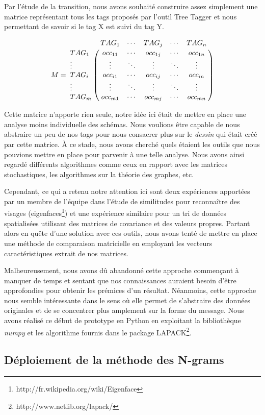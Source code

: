 \documentclass[a4paper,12pt]{report}
\begin{document}
Par l'étude de la transition, nous avons souhaité construire assez simplement une matrice représentant tous les tags proposés par l'outil Tree Tagger et nous permettant de savoir si le tag X est suivi du tag Y.

\[M=\bordermatrix{
&TAG_{1}&\cdots&TAG_{j}&\cdots&TAG_{n}\cr
TAG_{1}& occ_{11} & \cdots & occ_{1j} & \cdots & occ_{1n} \cr
\vdots&\vdots&\ddots&\vdots&\ddots&\vdots\cr
TAG_{i}& occ_{i1} & \cdots & occ_{ij} & \cdots & occ_{in} \cr
\vdots&\vdots&\ddots&\vdots&\ddots&\vdots\cr
TAG_{m}& occ_{m1} & \cdots & occ_{mj} & \cdots & occ_{mn} \cr
}\]

Cette matrice n'apporte rien seule, notre idée ici était de mettre en place une analyse moins individuelle des schémas. Nous voulions être capable de nous abstraire un peu de nos tags pour nous consacrer plus sur le \textit{dessin} qui était créé par cette matrice. À ce stade, nous avons cherché quels étaient les outils que nous pouvions mettre en place pour parvenir à une telle analyse. Nous avons ainsi regardé différents algorithmes comme ceux en rapport avec les matrices stochastiques, les algorithmes sur la théorie des graphes, etc. 

Cependant, ce qui a retenu notre attention ici sont deux expériences apportées par un membre de l'équipe dans l'étude de similitudes pour reconnaître des visages (eigenfaces\footnote{http://fr.wikipedia.org/wiki/Eigenface}) et une expérience similaire pour un tri de données spatialisées utilisant des matrices de covariance et des valeurs propres. Partant alors en quête d'une solution avec ces outils, nous avons tenté de mettre en place une méthode de comparaison matricielle en employant les vecteurs caractéristiques extrait de nos matrices.

Malheureusement, nous avons dû abandonné cette approche commençant à manquer de temps et sentant que nos connaissances auraient besoin d'être approfondies pour obtenir les prémices d'un résultat. Néanmoins, cette approche nous semble intéressante dans le sens où elle permet de s'abstraire des données originales et de se concentrer plus amplement sur la forme du message. Nous avons réalisé ce début de prototype en Python en exploitant la bibliothèque \textit{numpy} et les algorithme fournis dans le package LAPACK\footnote{http://www.netlib.org/lapack/}.

\subsection{Déploiement de la méthode des N-grams}
\end{document}
